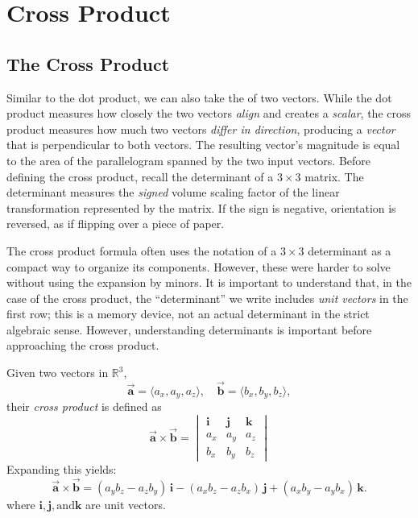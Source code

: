 \chapter{Cross Product}
\section{The Cross Product}
Similar to the dot product, we can also take the  of two vectors. 
While the dot product measures how closely the two vectors \emph{align} and creates a \emph{scalar}, the cross product measures how much two vectors \emph{differ in direction}, producing a \emph{vector} that is perpendicular to both vectors. The resulting vector's magnitude is equal to the area of the parallelogram spanned by the two input vectors.
Before defining the cross product, recall the determinant of a $3\times3$ matrix. The determinant measures the \emph{signed} volume scaling factor of the linear transformation represented by the matrix. If the sign is negative, orientation is reversed, as if flipping over a piece of paper. 

The cross product formula often uses the notation of a $3\times3$ determinant as a compact way to organize its components. However, these were harder to solve without using the expansion by minors. It is important to understand that, in the case of the cross product, the ``determinant'' we write includes \emph{unit vectors} in the first row; this is a memory device, not an actual determinant in the strict algebraic sense. However, understanding determinants is important before approaching the cross product. 
\begin{mdframed}[style=important]
Given two vectors in $\mathbb{R}^3$,
\[
\vec{\mathbf{a}} = \langle a_x, a_y, a_z \rangle, \quad
\vec{\mathbf{b}} = \langle b_x, b_y, b_z \rangle,
\]
their \emph{cross product} is defined as
\[
\vec{\mathbf{a}} \times \vec{\mathbf{b}} =
\begin{vmatrix}
\mathbf{i} & \mathbf{j} & \mathbf{k} \\
a_x & a_y & a_z \\
b_x & b_y & b_z
\end{vmatrix}
\]
Expanding this yields:
\[
\vec{\mathbf{a}} \times \vec{\mathbf{b}} =
(a_y b_z - a_z b_y)\,\mathbf{i}
- (a_x b_z - a_z b_x)\,\mathbf{j}
+ (a_x b_y - a_y b_x)\,\mathbf{k}.
\]
where $\mathbf{i}, \mathbf{j}, \text{and} \mathbf{k}$ are unit vectors.
\end{mdframed}


